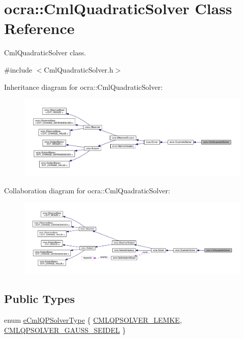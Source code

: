 \hypertarget{classocra_1_1CmlQuadraticSolver}{}\section{ocra\+:\+:Cml\+Quadratic\+Solver Class Reference}
\label{classocra_1_1CmlQuadraticSolver}


Cml\+Quadratic\+Solver class.  




{\ttfamily \#include $<$Cml\+Quadratic\+Solver.\+h$>$}



Inheritance diagram for ocra\+:\+:Cml\+Quadratic\+Solver\+:\nopagebreak
\begin{figure}[H]
\begin{center}
\leavevmode
\includegraphics[width=350pt]{d9/d05/classocra_1_1CmlQuadraticSolver__inherit__graph}
\end{center}
\end{figure}


Collaboration diagram for ocra\+:\+:Cml\+Quadratic\+Solver\+:\nopagebreak
\begin{figure}[H]
\begin{center}
\leavevmode
\includegraphics[width=350pt]{dd/d29/classocra_1_1CmlQuadraticSolver__coll__graph}
\end{center}
\end{figure}
\subsection*{Public Types}
\begin{DoxyCompactItemize}
\item 
enum \hyperlink{classocra_1_1CmlQuadraticSolver_a6d54dc2e4dac085099b002c88cb6d3df}{e\+Cml\+Q\+P\+Solver\+Type} \{ \hyperlink{classocra_1_1CmlQuadraticSolver_a6d54dc2e4dac085099b002c88cb6d3dfac7ab4857986d549d2c7ac2f4e7d834cc}{C\+M\+L\+Q\+P\+S\+O\+L\+V\+E\+R\+\_\+\+L\+E\+M\+KE}, 
\hyperlink{classocra_1_1CmlQuadraticSolver_a6d54dc2e4dac085099b002c88cb6d3dfa53afe853cc16e5023a4618d57cb082f1}{C\+M\+L\+Q\+P\+S\+O\+L\+V\+E\+R\+\_\+\+G\+A\+U\+S\+S\+\_\+\+S\+E\+I\+D\+EL}
 \}
\end{DoxyCompactItemize}
